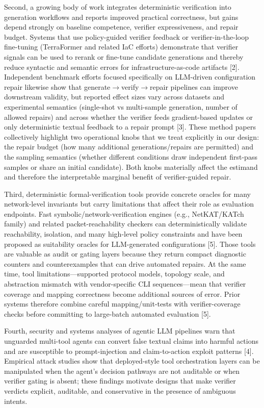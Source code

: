 \documentclass[conference]{IEEEtran}
\begin{document}
Second, a growing body of work integrates deterministic verification into generation workflows and reports improved practical correctness, but gains depend strongly on baseline competence, verifier expressiveness, and repair budget. Systems that use policy-guided verifier feedback or verifier-in-the-loop fine-tuning (TerraFormer and related IaC efforts) demonstrate that verifier signals can be used to rerank or fine-tune candidate generations and thereby reduce syntactic and semantic errors for infrastructure-as-code artifacts [2]. Independent benchmark efforts focused specifically on LLM-driven configuration repair likewise show that generate\ensuremath{\rightarrow}verify\ensuremath{\rightarrow}repair pipelines can improve downstream validity, but reported effect sizes vary across datasets and experimental semantics (single-shot vs multi-sample generation, number of allowed repairs) and across whether the verifier feeds gradient-based updates or only deterministic textual feedback to a repair prompt [3]. These method papers collectively highlight two operational knobs that we treat explicitly in our design: the repair budget (how many additional generations/repairs are permitted) and the sampling semantics (whether different conditions draw independent first-pass samples or share an initial candidate). Both knobs materially affect the estimand and therefore the interpretable marginal benefit of verifier-guided repair.

Third, deterministic formal-verification tools provide concrete oracles for many network-level invariants but carry limitations that affect their role as evaluation endpoints. Fast symbolic/network-verification engines (e.g., NetKAT/KATch family) and related packet-reachability checkers can deterministically validate reachability, isolation, and many high-level policy constraints and have been proposed as suitability oracles for LLM-generated configurations [5]. Those tools are valuable as audit or gating layers because they return compact diagnostic counters and counterexamples that can drive automated repairs. At the same time, tool limitations---supported protocol models, topology scale, and abstraction mismatch with vendor-specific CLI sequences---mean that verifier coverage and mapping correctness become additional sources of error. Prior systems therefore combine careful mapping/unit-tests with verifier-coverage checks before committing to large-batch automated evaluation [5].

Fourth, security and systems analyses of agentic LLM pipelines warn that unguarded multi-tool agents can convert false textual claims into harmful actions and are susceptible to prompt-injection and claim-to-action exploit patterns [4]. Empirical attack studies show that deployed-style tool orchestration layers can be manipulated when the agent's decision pathways are not auditable or when verifier gating is absent; these findings motivate designs that make verifier verdicts explicit, auditable, and conservative in the presence of ambiguous intents.
\end{document}
